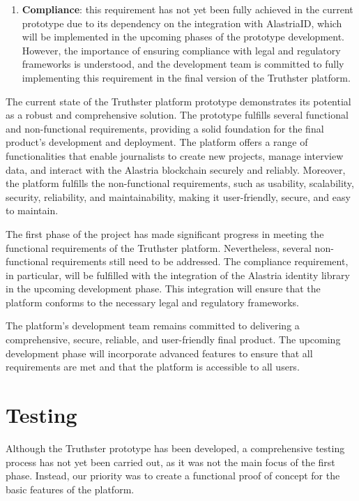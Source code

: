 \documentclass[target=mst,aauheader=]{thud}
\begin{document}
\begin{enumerate}
        \item \textbf{Compliance}: this requirement has not yet been fully achieved in the current prototype due to its dependency on the integration with AlastriaID, which will be implemented in the upcoming phases of the prototype development. However, the importance of ensuring compliance with legal and regulatory frameworks is understood, and the development team is committed to fully implementing this requirement in the final version of the Truthster platform.
    
    \end{enumerate}


The current state of the Truthster platform prototype demonstrates its potential as a robust and comprehensive solution. The prototype fulfills several functional and non-functional requirements, providing a solid foundation for the final product's development and deployment. The platform offers a range of functionalities that enable journalists to create new projects, manage interview data, and interact with the Alastria blockchain securely and reliably. Moreover, the platform fulfills the non-functional requirements, such as usability, scalability, security, reliability, and maintainability, making it user-friendly, secure, and easy to maintain.

The first phase of the project has made significant progress in meeting the functional requirements of the Truthster platform. Nevertheless, several non-functional requirements still need to be addressed. The compliance requirement, in particular, will be fulfilled with the integration of the Alastria identity library in the upcoming development phase. This integration will ensure that the platform conforms to the necessary legal and regulatory frameworks.

The platform's development team remains committed to delivering a comprehensive, secure, reliable, and user-friendly final product. The upcoming development phase will incorporate advanced features to ensure that all requirements are met and that the platform is accessible to all users.

\section{Testing}

Although the Truthster prototype has been developed, a comprehensive testing process has not yet been carried out, as it was not the main focus of the first phase. Instead, our priority was to create a functional proof of concept for the basic features of the platform.
\end{document}
